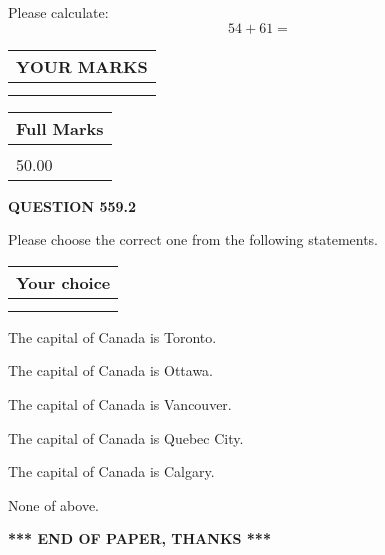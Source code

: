 \documentclass[12pt]{article}
\begin{document}
  
 
Please calculate:
\begin{equation}
54 +  %
61 = \nonumber
\end{equation}
 

 

 
  
\vspace{0.2in}
  
\noindent\begin{tabular}{|l|}
\hline
 YOUR MARKS  \\
\hline
 \\ 
 \\ 
\hline
\end{tabular}
\hspace{0.05in} \begin{tabular}{|l|}
\hline
 Full Marks  \\
\hline
 \\ 
50.00 \\
\hline
\end{tabular}
{\textbf{\Large{QUESTION
559.2 
}}}
  
  
Please choose the correct one from the following statements.
  
  
\noindent\hspace{3.0in} \begin{tabular}{|l|}
\hline
Your choice \\
\hline
 \\ 
 \\ 
\hline
\end{tabular}
  
  
 
 
The capital of Canada is Toronto.
 
 
The capital of Canada is Ottawa.
 
 
The capital of Canada is Vancouver.
 
 
The capital of Canada is Quebec City.
 
 
The capital of Canada is Calgary.
 
 
 None of above.
 
 
   
   
 \vspace{0.2in}
 
   
   
   
   
\vspace{1.0in} 
{\textbf{\large{ *** END OF PAPER, THANKS *** }}} 
   
\end{document}
